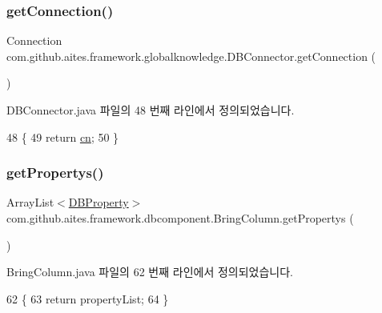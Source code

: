 \subsubsection{\texorpdfstring{get\+Connection()}{getConnection()}}
{\footnotesize\ttfamily Connection com.\+github.\+aites.\+framework.\+globalknowledge.\+D\+B\+Connector.\+get\+Connection (\begin{DoxyParamCaption}{ }\end{DoxyParamCaption})\hspace{0.3cm}{\ttfamily [inherited]}}



D\+B\+Connector.\+java 파일의 48 번째 라인에서 정의되었습니다.


\begin{DoxyCode}
48                                      \{
49         \textcolor{keywordflow}{return} \mbox{\hyperlink{classcom_1_1github_1_1aites_1_1framework_1_1globalknowledge_1_1_d_b_connector_af00c95ca08c2b39cb47ee4286e9f2469}{cn}};
50     \}
\end{DoxyCode}
\mbox{\label{classcom_1_1github_1_1aites_1_1framework_1_1dbcomponent_1_1_bring_column_a058442165c11bf22ccd9d146fe9c4bd4}} 
\subsubsection{\texorpdfstring{get\+Propertys()}{getPropertys()}}
{\footnotesize\ttfamily Array\+List$<$\mbox{\hyperlink{classcom_1_1github_1_1aites_1_1framework_1_1dbcomponent_1_1_d_b_property}{D\+B\+Property}}$>$ com.\+github.\+aites.\+framework.\+dbcomponent.\+Bring\+Column.\+get\+Propertys (\begin{DoxyParamCaption}{ }\end{DoxyParamCaption})}



Bring\+Column.\+java 파일의 62 번째 라인에서 정의되었습니다.


\begin{DoxyCode}
62                                                \{
63         \textcolor{keywordflow}{return} propertyList;
64     \}
\end{DoxyCode}
\mbox{\label{classcom_1_1github_1_1aites_1_1framework_1_1dbcomponent_1_1_bring_column_ada5f3bc1e66d57b51a6a936cf7b6c6d9}} 
